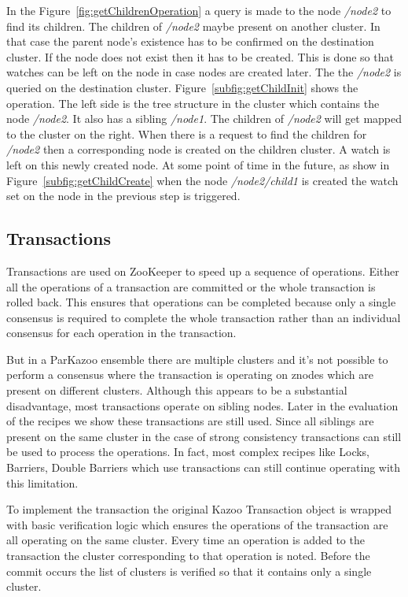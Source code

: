 

In the Figure~\ref{fig:getChildrenOperation} a query is made to the node \textit{/node2} to find its children. The children of \textit{/node2} maybe present on another cluster. In that case the parent node's existence has to be confirmed on the destination cluster. If the node does not exist then it has to be created. This is done so that watches can be left on the node in case nodes are created later. The the \textit{/node2} is queried on the destination cluster. Figure~\ref{subfig:getChildInit} shows the operation. The left side is the tree structure in the cluster which contains the node \textit{/node2}. It also has a sibling \textit{/node1}. The children of \textit{/node2} will get mapped to the cluster on the right. When there is a request to find the children for \textit{/node2} then a corresponding node is created on the children cluster. A watch is left on this newly created node. At some point of time in the future, as show in Figure~\ref{subfig:getChildCreate} when the node \textit{/node2/child1} is created the watch set on the node in the previous step is triggered.

\subsection{Transactions}
Transactions are used on ZooKeeper to speed up a sequence of operations. Either all the operations of a transaction are committed or the whole transaction is rolled back. This ensures that operations can be completed because only a single consensus is required to complete the whole transaction rather than an individual consensus for each operation in the transaction.
    
But in a ParKazoo ensemble there are multiple clusters and it's not possible to perform a consensus where the transaction is operating on znodes which are present on different clusters. Although this appears to be a substantial disadvantage, most transactions operate on sibling nodes. Later in the evaluation of the recipes we show these transactions are still used. Since all siblings are present on the same cluster in the case of strong consistency transactions can still be used to process the operations. In fact, most complex recipes like Locks, Barriers, Double Barriers which use transactions can still continue operating with this limitation.
    
To implement the transaction the original Kazoo Transaction object is wrapped with basic verification logic which ensures the operations of the transaction are all operating on the same cluster. Every time an operation is added to the transaction the cluster corresponding to that operation is noted. Before the commit occurs the list of clusters is verified so that it contains only a single cluster.
    
